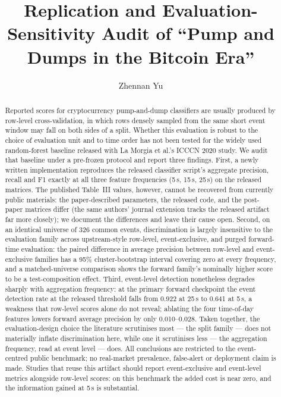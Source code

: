 \documentclass[runningheads]{llncs}
\newif\ifanonymous
\begin{document}
\title{Replication and Evaluation-Sensitivity Audit of ``Pump and Dumps
in the Bitcoin Era''}

\ifanonymous
\author{Anonymous Submission to FC 2027}
\authorrunning{Anonymous Submission to FC 2027}
\institute{}
\else
\author{Zhennan Yu}
\fi

\maketitle

\begin{abstract}
Reported scores for cryptocurrency pump-and-dump classifiers are usually
produced by row-level cross-validation, in which rows densely sampled
from the same short event window may fall on both sides of a split.
Whether this evaluation is robust to the choice of evaluation unit and
to time order has not been tested for the widely used random-forest
baseline released with La Morgia et al.'s ICCCN 2020 study. We audit
that baseline under a pre-frozen protocol and report three findings.
First, a newly written implementation reproduces the released classifier
script's aggregate precision, recall and F1 exactly at all three feature
frequencies (5\,s, 15\,s, 25\,s) on the released matrices. The published
Table~III values, however, cannot be recovered from currently public
materials: the paper-described parameters, the released code, and the
post-paper matrices differ (the same authors' journal extension tracks
the released artifact far more closely); we document the differences and
leave their cause open. Second, on an identical universe of 326 common
events, discrimination is largely insensitive to the evaluation family
across upstream-style row-level, event-exclusive, and purged
forward-time evaluation: the paired difference in average precision
between row-level and event-exclusive families has a 95\%
cluster-bootstrap interval covering zero at every frequency, and a
matched-universe comparison shows the forward family's nominally higher
score to be a test-composition effect. Third, event-level detection
nonetheless degrades sharply with aggregation frequency: at the primary
forward checkpoint the event detection rate at the released threshold
falls from 0.922 at 25\,s to 0.641 at 5\,s, a weakness that row-level
scores alone do not reveal; ablating the four time-of-day features
lowers forward average precision by only 0.010--0.028. Taken together,
the evaluation-design choice the literature scrutinises most --- the
split family --- does not materially inflate discrimination here, while
one it scrutinises less --- the aggregation frequency, read at event
level --- does. All conclusions are restricted to the event-centred
public benchmark; no real-market prevalence, false-alert or deployment
claim is made. Studies that reuse this artifact should report
event-exclusive and event-level metrics alongside row-level scores: on
this benchmark the added cost is near zero, and the information gained
at 5\,s is substantial.


\end{abstract}
\end{document}
